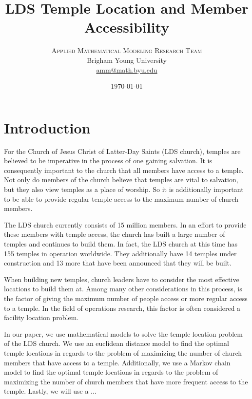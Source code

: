 \documentclass[twoside,twocolumn]{article}
\title{LDS Temple Location and Member Accessibility} %
\author{%
\textsc{Applied Mathematical Modeling Research Team}\\[1ex] %
\normalsize Brigham Young University  \\ %
\normalsize \href{mailto:amm@math.byu.edu}{amm@math.byu.edu} %
}
\date{\today} %
\begin{document}
\maketitle



\section{Introduction}

For the Church of Jesus Christ of Latter-Day Saints (LDS church), temples are believed to be imperative in the process of one gaining salvation.
It is consequently important to the church that all members have access to a temple.
Not only do members of the church believe that temples are vital to salvation, but they also view temples as a place of worship.
So it is additionally important to be able to provide regular temple access to the maximum number of church members.

The LDS church currently consists of 15 million members.
In an effort to provide these members with temple access, the church has built a large number of temples and continues to build them.
In fact, the LDS church at this time has 155 temples in operation worldwide. 
They additionally have 14 temples under construction and 13 more that have been announced that they will be built.

When building new temples, church leaders have to consider the most effective locations to build them at.
Among many other considerations in this process, is the factor of giving the maximum number of people access or more regular access to a temple.
In the field of operations research, this factor is often considered a facility location problem.


In our paper, we use mathematical models to solve the temple location problem of the LDS church. We use an euclidean distance model to find the optimal temple locations in regards to the problem of maximizing the number of church members that have access to a temple. Additionally, we use a Markov chain model to find the optimal temple locations in regards to the problem of maximizing the number of church members that have more frequent access to the temple. Lastly, we will use a ... %
\end{document}

